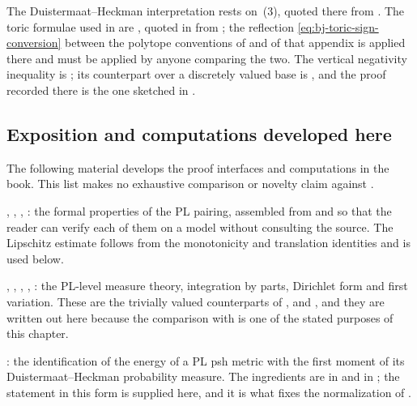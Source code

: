 The Duistermaat--Heckman interpretation  rests on
\,(3), quoted there from
\cite[Corollary~3.4]{BHJ17}.  The toric formulae used in
 are , quoted in
 from \cite[Appendix~B]{BJ22}; the reflection
\eqref{eq:bj-toric-sign-conversion} between the polytope conventions of
 and of that appendix is applied there and
must be applied by anyone comparing the two.  The vertical negativity
inequality  is
\cite[Lemma~3.24]{BJ22}; its counterpart over a discretely valued base is
, and the proof recorded there is the one
sketched in .

\subsection{Exposition and computations developed here}
\label{sec:ch46-additions}

The following material develops the proof interfaces and computations
in the book.  This list makes no exhaustive comparison or novelty claim
against \cite{BJ22}.

, ,
, : the formal
properties of the PL pairing, assembled from
 and
 so that the reader can verify each of
them on a model without consulting the source.  The Lipschitz estimate follows from the monotonicity and translation
identities and is used below.

, ,
,
,
: the PL-level measure theory, integration by
parts, Dirichlet form and first variation.  These are the trivially valued
counterparts of ,
 and
, and they are written out here because
the comparison with  is one of the stated purposes of this
chapter.

: the identification of the energy of a PL psh
metric with the first moment of its Duistermaat--Heckman probability
measure.  The ingredients are in \cite{BHJ17} and in
; the statement in this form is supplied
here, and it is what fixes the normalization of
.

